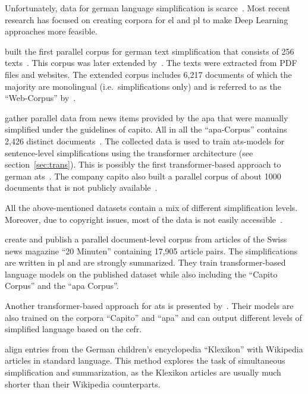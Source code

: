 Unfortunately, data for german language simplification is scarce~\autocite{Ansch_tz_2023}.
Most recent research has focused on creating corpora for \gls{el} and \gls{pl} to make Deep Learning approaches more feasible.

\textcite{klaper-etal-2013-building} built the first parallel corpus for german text simplification that consists of 256 texts~\autocite{ebeling2022}.
This corpus was later extended by~\textcite{battisti-etal-2020-corpus}.
The texts were extracted from PDF files and websites.
The extended corpus includes 6,217 documents of which the majority are monolingual (i.e.\ simplifications only) and is referred to as the \enquote{Web-Corpus} by~\textcite{ebeling2022}.

\textcite{sauberli-etal-2020-benchmarking} gather parallel data from news items provided by the \gls{apa} that were manually simplified under the guidelines of \gls{capito}.
All in all the \enquote{\gls{apa}-Corpus} contains 2,426 distinct documents~\autocite{ebeling2022}.
The collected data is used to train \gls{ats}-models for sentence-level simplifications using the transformer architecture (see section~\ref{sec:trans}).
This is possibly the first transformer-based approach to german \gls{ats}~\autocite{Ansch_tz_2023}.
The company \gls{capito} also built a parallel corpus of about 1000 documents that is not publicly available~\autocite{ebeling2022}.

All the above-mentioned datasets contain a mix of different simplification levels.
Moreover, due to copyright issues, most of the data is not easily accessible~\autocite{stodden-etal-2023-deplain}.

\textcite{rios-etal-2021-new} create and publish a parallel document-level corpus from articles of the Swiss news magazine \enquote{20 Minuten} containing 17,905 article pairs.
The simplifications are written in \gls{pl} and are strongly summarized.
They train transformer-based language models on the published dataset while also including the \enquote{Capito Corpus} and the \enquote{\gls{apa} Corpus}.

Another transformer-based approach for \gls{ats} is presented by~\textcite{spring-etal-2021-exploring}.
Their models are also trained on the corpora \enquote{Capito} and \enquote{\gls{apa}} and can output different levels of simplified language based on the \gls{cefr}.

\textcite{aumiller2022klexikon} align entries from the German children’s encyclopedia \enquote{Klexikon} with Wikipedia articles in standard language.
This method explores the task of simultaneous simplification and summarization, as the Klexikon articles are usually much shorter than their Wikipedia counterparts.

